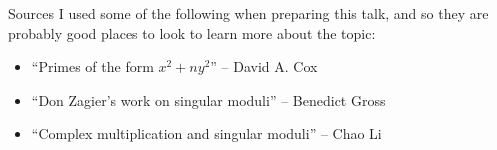\documentclass{beamer}
\begin{document}
\begin{frame}{Sources}
I used some of the following when preparing this talk, and so they are probably good places to look to learn more about the topic:
\begin{itemize}
\item ``Primes of the form $x^2 + ny^2$'' -- David A. Cox
\item ``Don Zagier's work on singular moduli'' -- Benedict Gross
\item ``Complex multiplication and singular moduli'' -- Chao Li
\end{itemize}
\end{frame}
\end{document}
